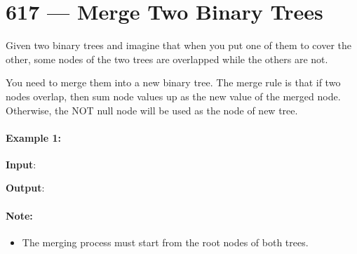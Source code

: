 \section{617 --- Merge Two Binary Trees}
Given two binary trees and imagine that when you put one of them to cover the other, some nodes of the two trees are overlapped while the others are not.

You need to merge them into a new binary tree. The merge rule is that if two nodes overlap, then sum node values up as the new value of the merged node. Otherwise, the NOT null node will be used as the node of new tree.

\paragraph{Example 1:}

\begin{flushleft}
\textbf{Input}:

\begin{figure}[H]
\end{figure}


\textbf{Output}:

\begin{figure}[H]
\end{figure}


\end{flushleft}

\paragraph{Note:} 
\begin{itemize}
\item The merging process must start from the root nodes of both trees.
\end{itemize}

